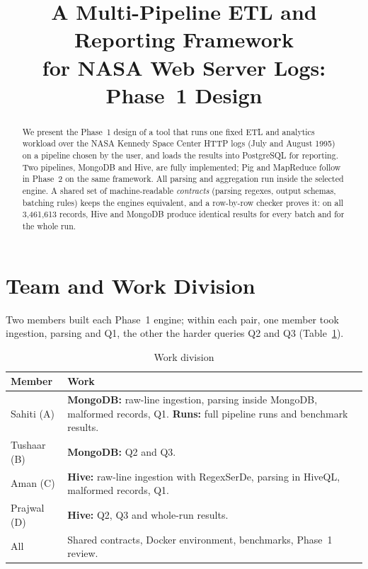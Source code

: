 \documentclass[conference]{IEEEtran}
\begin{document}
\title{A Multi-Pipeline ETL and Reporting Framework\\for NASA Web Server Logs: Phase~1 Design}

\author{
}

\maketitle

\begin{abstract}
We present the Phase~1 design of a tool that runs one fixed ETL and analytics workload over the
NASA Kennedy Space Center HTTP logs (July and August 1995) on a pipeline chosen by the user, and
loads the results into PostgreSQL for reporting. Two pipelines, MongoDB and Hive, are fully
implemented; Pig and MapReduce follow in Phase~2 on the same framework. All parsing and
aggregation run inside the selected engine. A shared set of machine-readable \emph{contracts}
(parsing regexes, output schemas, batching rules) keeps the engines equivalent, and a
row-by-row checker proves it: on all 3,461,613 records, Hive and MongoDB produce identical
results for every batch and for the whole run.
\end{abstract}

\section{Team and Work Division}
Two members built each Phase~1 engine; within each pair, one member took ingestion, parsing
and Q1, the other the harder queries Q2 and Q3 (Table~\ref{tab:team}).

\begin{table}[h]
\caption{Work division}
\label{tab:team}
\centering
\small
\begin{tabular}{@{}>{\raggedright\arraybackslash}p{}>{\raggedright\arraybackslash}p{}@{}}
\toprule
Member & Work \\
\midrule
Sahiti (A) & \textbf{MongoDB:} raw-line ingestion, parsing inside MongoDB, malformed records, Q1.
             \textbf{Runs:} full pipeline runs and benchmark results. \\
Tushaar (B) & \textbf{MongoDB:} Q2 and Q3. \\
Aman (C)   & \textbf{Hive:} raw-line ingestion with RegexSerDe, parsing in HiveQL, malformed
             records, Q1. \\
Prajwal (D)& \textbf{Hive:} Q2, Q3 and whole-run results. \\
\midrule
All        & Shared contracts, Docker environment, benchmarks, Phase~1 review. \\
\bottomrule
\end{tabular}
\end{table}
\end{document}
